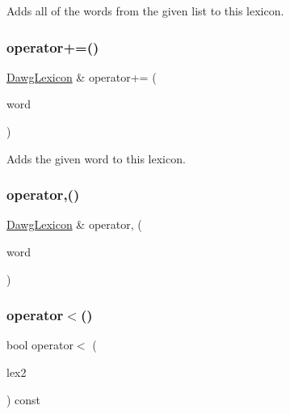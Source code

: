 Adds all of the words from the given list to this lexicon. 

\mbox{\label{classDawgLexicon_a8d7fe415402649e86e5ccbb3738d358e}} 
\subsubsection{\texorpdfstring{operator+=()}{operator+=()}\hspace{0.1cm}{\footnotesize\ttfamily [3/3]}}
{\footnotesize\ttfamily \mbox{\hyperlink{classDawgLexicon}{Dawg\+Lexicon}} \& operator+= (\begin{DoxyParamCaption}\item[{const std\+::string \&}]{word }\end{DoxyParamCaption})}



Adds the given word to this lexicon. 

\mbox{\label{classDawgLexicon_ad749b5a8bca43259350ee643e152c2d8}} 
\subsubsection{\texorpdfstring{operator,()}{operator,()}}
{\footnotesize\ttfamily \mbox{\hyperlink{classDawgLexicon}{Dawg\+Lexicon}} \& operator, (\begin{DoxyParamCaption}\item[{const std\+::string \&}]{word }\end{DoxyParamCaption})}

\mbox{\label{classDawgLexicon_aa7c66db17666a22697ec8076716c3680}} 
\subsubsection{\texorpdfstring{operator$<$()}{operator<()}}
{\footnotesize\ttfamily bool operator$<$ (\begin{DoxyParamCaption}\item[{const \mbox{\hyperlink{classDawgLexicon}{Dawg\+Lexicon}} \&}]{lex2 }\end{DoxyParamCaption}) const}



